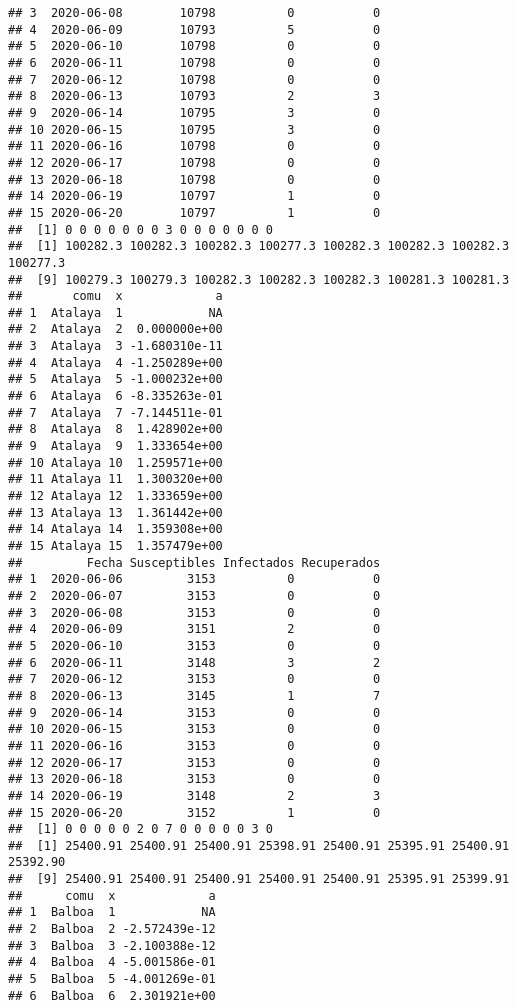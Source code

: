 \documentclass[
]{article}
\begin{document}
\begin{verbatim}
## 3  2020-06-08        10798          0           0
## 4  2020-06-09        10793          5           0
## 5  2020-06-10        10798          0           0
## 6  2020-06-11        10798          0           0
## 7  2020-06-12        10798          0           0
## 8  2020-06-13        10793          2           3
## 9  2020-06-14        10795          3           0
## 10 2020-06-15        10795          3           0
## 11 2020-06-16        10798          0           0
## 12 2020-06-17        10798          0           0
## 13 2020-06-18        10798          0           0
## 14 2020-06-19        10797          1           0
## 15 2020-06-20        10797          1           0
##  [1] 0 0 0 0 0 0 0 3 0 0 0 0 0 0 0
##  [1] 100282.3 100282.3 100282.3 100277.3 100282.3 100282.3 100282.3 100277.3
##  [9] 100279.3 100279.3 100282.3 100282.3 100282.3 100281.3 100281.3
##       comu  x             a
## 1  Atalaya  1            NA
## 2  Atalaya  2  0.000000e+00
## 3  Atalaya  3 -1.680310e-11
## 4  Atalaya  4 -1.250289e+00
## 5  Atalaya  5 -1.000232e+00
## 6  Atalaya  6 -8.335263e-01
## 7  Atalaya  7 -7.144511e-01
## 8  Atalaya  8  1.428902e+00
## 9  Atalaya  9  1.333654e+00
## 10 Atalaya 10  1.259571e+00
## 11 Atalaya 11  1.300320e+00
## 12 Atalaya 12  1.333659e+00
## 13 Atalaya 13  1.361442e+00
## 14 Atalaya 14  1.359308e+00
## 15 Atalaya 15  1.357479e+00
##         Fecha Susceptibles Infectados Recuperados
## 1  2020-06-06         3153          0           0
## 2  2020-06-07         3153          0           0
## 3  2020-06-08         3153          0           0
## 4  2020-06-09         3151          2           0
## 5  2020-06-10         3153          0           0
## 6  2020-06-11         3148          3           2
## 7  2020-06-12         3153          0           0
## 8  2020-06-13         3145          1           7
## 9  2020-06-14         3153          0           0
## 10 2020-06-15         3153          0           0
## 11 2020-06-16         3153          0           0
## 12 2020-06-17         3153          0           0
## 13 2020-06-18         3153          0           0
## 14 2020-06-19         3148          2           3
## 15 2020-06-20         3152          1           0
##  [1] 0 0 0 0 0 2 0 7 0 0 0 0 0 3 0
##  [1] 25400.91 25400.91 25400.91 25398.91 25400.91 25395.91 25400.91 25392.90
##  [9] 25400.91 25400.91 25400.91 25400.91 25400.91 25395.91 25399.91
##      comu  x             a
## 1  Balboa  1            NA
## 2  Balboa  2 -2.572439e-12
## 3  Balboa  3 -2.100388e-12
## 4  Balboa  4 -5.001586e-01
## 5  Balboa  5 -4.001269e-01
## 6  Balboa  6  2.301921e+00

\end{verbatim}
\end{document}
